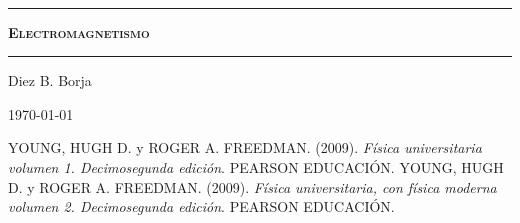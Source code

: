 \documentclass[letterpaper, onecolumn, 11pt]{report}
\begin{document}
\sffamily
\begin{center}

\

\vspace{6.5cm}

\rule{15cm}{0.1cm}

\vspace{1.5cm}

{\huge \textsc{\textbf{Electromagnetismo}}}

\vspace{1.5cm}

\rule{15cm}{0.1cm}

\vspace{1.5cm}
Diez B. Borja

\today

\end{center}
\tableofcontents







%


\appendix


\newpage
\begin{thebibliography}{}
YOUNG, HUGH D. y ROGER A. FREEDMAN. (2009). \textit{Física universitaria volumen 1. Decimosegunda edición}. PEARSON EDUCACIÓN.
 YOUNG, HUGH D. y ROGER A. FREEDMAN. (2009). \textit{Física universitaria, con física moderna volumen 2.
Decimosegunda edición}. PEARSON EDUCACIÓN.

\end{thebibliography}
\end{document}
